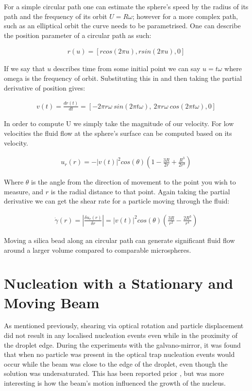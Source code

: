 For a simple circular path one can estimate the sphere's speed by the 
radius of its path and the frequency of its orbit $U = R\omega$; however 
for a more complex path, such as an elliptical orbit the curve needs 
to be parametrised. One can describe the position parameter of a circular 
path as such:

\begin{align}
	r(u) = \left[rcos(2\pi u), rsin(2\pi u), 0 \right]
\end{align}

If we say that $u$ describes time from some initial point we can say $u=t\omega$ 
where omega is the frequency of orbit. Substituting this in and then taking 
the partial derivative of position gives:

\begin{align}
	v(t) = \frac{dr(t)}{dt} = \left[-2\pi r\omega \ sin(2\pi t\omega),
	\ 2\pi r\omega \ cos(2\pi t\omega), 0 \right]
\end{align}

In order to compute U we simply take the magnitude of our velocity. 
For low velocities the fluid flow at the sphere's surface can be computed 
based on its velocity.

\begin{align}
	u_r(r)=-|v(t)|^2cos(\theta)\left(1-\frac{3R}{2r}+\frac{R^3}{2r^3}\right)
\end{align}

Where $\theta$ is the angle from the direction of movement to the point
you wish to measure, and $r$ is the radial distance to that point. Again
taking the partial derivative we can get the shear rate for a particle moving 
through the fluid:

\begin{align}
	\dot{\gamma}(r) = \left| \frac{\delta u_r(r)}{\delta r}\right| = |v(t)|^2cos(\theta)\left(\frac{3R}{r^2} -\frac{2R^3}{r^4} \right)
\end{align}

Moving a silica bead along an circular path can generate significant fluid 
flow around a larger volume compared to comparable microspheres.

\section{Nucleation with a Stationary and Moving Beam}
As mentioned previously, shearing via optical rotation and particle displacement
did not result in any localised nucleation events even while in the proximity of 
the droplet edge. During the experiments with the galvano-mirror, it was found 
that when no particle was present in the optical trap nucleation events would 
occur while the beam was close to the edge of the droplet, even though the solution
was undersaturated. This has been reported prior \cite{Rungsimanon2010, Liao2022}, 
but was more interesting is how the beam's motion influenced the growth of the nucleus.

